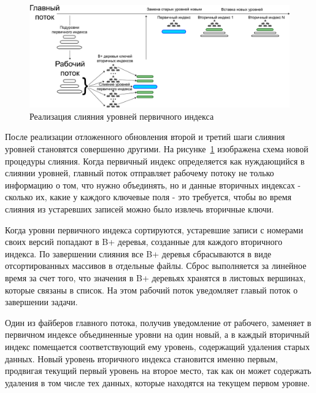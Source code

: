 \documentclass[a4paper,hidelinks,12pt]{article}
\begin{document}
\begin{figure}
\centering
\includegraphics[width=1\textwidth]{compaction_implementation}
\caption{Реализация слияния уровней первичного индекса}
\label{fig:compaction_implementation}
\end{figure}

После реализации отложенного обновления второй и третий шаги слияния уровней
становятся совершенно другими. На рисунке~\ref{fig:compaction_implementation}
изображена схема новой процедуры слияния. Когда первичный индекс определяется
как нуждающийся в слиянии уровней, главный поток отправляет рабочему потоку не
только информацию о том, что нужно объединять, но и данные вторичных индексах -
сколько их, какие у каждого ключевые поля - это требуется, чтобы во время
слияния из устаревших записей можно было извлечь вторичные ключи.

Когда уровни первичного индекса сортируются, устаревшие записи с номерами своих
версий попадают в B+ деревья, созданные для каждого вторичного индекса. По
завершении слияния все B+ деревья сбрасываются в виде отсортированных массивов
в отдельные файлы. Сброс выполняется за линейное время за счет того, что
значения в B+ деревьях хранятся в листовых вершинах, которые связаны в список.
На этом рабочий поток уведомляет главый поток о завершении задачи.

Один из файберов главного потока, получив уведомление от рабочего, заменяет в
первичном индексе объединенные уровни на один новый, а в каждый вторичный индекс
помещается соответствующий ему уровень, содержащий удаления старых данных. Новый
уровень вторичного индекса становится именно первым, продвигая текущий первый
уровень на второе место, так как он может содержать удаления в том числе тех
данных, которые находятся на текущем первом уровне.
\end{document}
